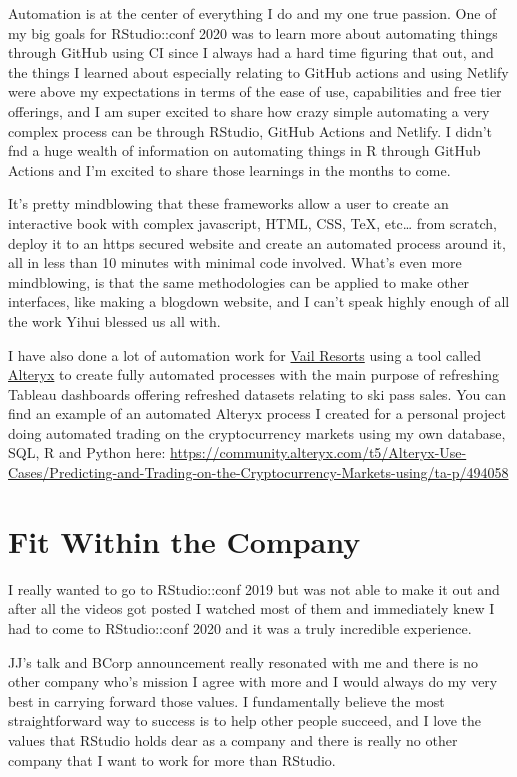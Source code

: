 \documentclass[
]{book}
\begin{document}
Automation is at the center of everything I do and my one true passion. One of my big goals for RStudio::conf 2020 was to learn more about automating things through GitHub using CI since I always had a hard time figuring that out, and the things I learned about especially relating to GitHub actions and using Netlify were above my expectations in terms of the ease of use, capabilities and free tier offerings, and I am super excited to share how crazy simple automating a very complex process can be through RStudio, GitHub Actions and Netlify. I didn't fnd a huge wealth of information on automating things in R through GitHub Actions and I'm excited to share those learnings in the months to come.

It's pretty mindblowing that these frameworks allow a user to create an interactive book with complex javascript, HTML, CSS, TeX, etc\ldots{} from scratch, deploy it to an https secured website and create an automated process around it, all in less than 10 minutes with minimal code involved. What's even more mindblowing, is that the same methodologies can be applied to make other interfaces, like making a blogdown website, and I can't speak highly enough of all the work Yihui blessed us all with.

I have also done a lot of automation work for \href{https://www.google.com/search?q=vail+resorts+stock}{Vail Resorts} using a tool called \href{https://www.alteryx.com/}{Alteryx} to create fully automated processes with the main purpose of refreshing Tableau dashboards offering refreshed datasets relating to ski pass sales. You can find an example of an automated Alteryx process I created for a personal project doing automated trading on the cryptocurrency markets using my own database, SQL, R and Python here: \url{https://community.alteryx.com/t5/Alteryx-Use-Cases/Predicting-and-Trading-on-the-Cryptocurrency-Markets-using/ta-p/494058}

\hypertarget{rstudio}{%
\section{Fit Within the Company}\label{rstudio}}

I really wanted to go to RStudio::conf 2019 but was not able to make it out and after all the videos got posted I watched most of them and immediately knew I had to come to RStudio::conf 2020 and it was a truly incredible experience.

JJ's talk and BCorp announcement really resonated with me and there is no other company who's mission I agree with more and I would always do my very best in carrying forward those values. I fundamentally believe the most straightforward way to success is to help other people succeed, and I love the values that RStudio holds dear as a company and there is really no other company that I want to work for more than RStudio.
\end{document}
